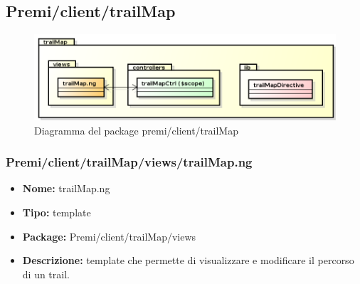 \subsection{Premi/client/trailMap}
\begin{figure}[!h]
\begin{center}
\includegraphics[scale=0.45]{img/diapkg/trailMap.png}
\caption{Diagramma del package premi/client/trailMap}
\end{center}
\end{figure}
\subsubsection{Premi/client/trailMap/views/trailMap.ng}
\begin{itemize}
  \item[] \textbf{Nome:} trailMap.ng
  \item[] \textbf{Tipo:} template
  \item[] \textbf{Package:} Premi/client/trailMap/views
  \item[] \textbf{Descrizione:}  template che permette di visualizzare e modificare il percorso di un trail.
\end{itemize}
